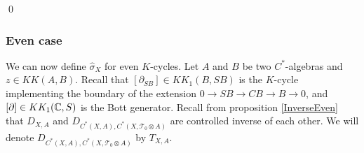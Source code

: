 \begin{dem}
\begin{enumerate}
\end{enumerate}
\qed
\end{dem}

\subsubsection{Even case} %

We can now define $\hat\sigma_X$ for even $K$-cycles. Let $A$ and $B$ be two $C^*$-algebras and $z\in KK(A,B)$. Recall that $[\partial_{SB}]\in KK_1(B,SB)$ is the $K$-cycle implementing the boundary of the extension $0\rightarrow SB\rightarrow CB\rightarrow B\rightarrow 0$, and $[\partial]\in KK_1(\mathbb C,S)$ is the Bott generator. Recall from proposition \ref{InverseEven} that $D_{X,A}$  and $D_{ C^*(X,A),C^*(X,\mathcal T_0\otimes A) }$ are controlled inverse of each other. We will denote $D_{ C^*(X,A),C^*(X,\mathcal T_0\otimes A) }$ by $T_{X,A}$.\\

